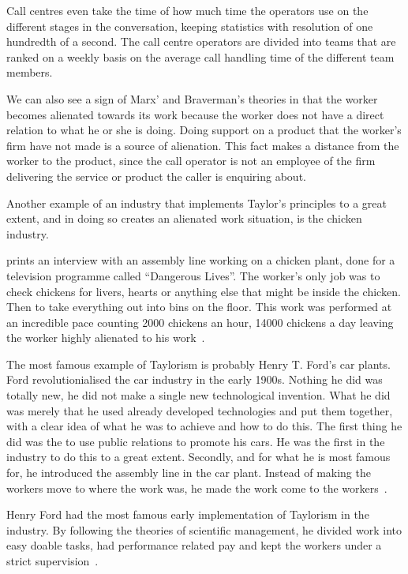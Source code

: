 \documentclass[a4paper,12pt,titlepage]{article}
\begin{document}
  Call centres even take the time of how much time the operators
  use on the different stages in the conversation, keeping statistics
  with resolution of one hundredth of a second.
  The call centre operators are divided into
  teams that are ranked on a weekly basis on the average call
  handling time of the different team members. 
  
  We can also see a sign of Marx' and Braverman's theories in that
  the worker becomes alienated towards its work because the worker does not
  have a direct relation to what he or she is doing. Doing support on a
  product that the worker's firm have not made is a source of alienation.
  This fact makes a distance from the worker to the product, 
  since the call operator is not an employee of the firm delivering
  the service or product the caller is enquiring about.

  Another example of an industry that implements Taylor's principles
  to a great extent, and in doing so creates an alienated work situation,
  is the chicken industry. 

  \cite{mnpb} prints an interview with an assembly line working on
  a chicken plant, done for a television programme called ``Dangerous Lives''.
  The worker's only job was to check chickens for livers, hearts or
  anything else that might be inside the chicken. Then to take everything
  out into bins on the floor. This work was performed at an
  incredible pace counting 2000 chickens an hour, 14000 chickens a day
  leaving the worker highly alienated to his work~\cite[147-148]{mnpb}.
  
  The most famous example of Taylorism is probably Henry T. Ford's
  car plants. Ford revolutionialised the car industry in the early 1900s.
  Nothing he did was totally new, he did not make a single new
  technological invention. What he did was merely that he used already
  developed technologies and put them together, with a clear idea
  of what he was to achieve and how to do this.
  The first thing he did was the to use public relations to promote his
  cars. He was the first in the industry to do this to a great extent.
  Secondly, and for what he is most famous for, he introduced the
  assembly line in the car plant. Instead of making the workers move
  to where the work was, he made the work come to the workers~\cite[18]{be}.

  Henry Ford had the most famous early implementation of Taylorism in
  the industry. By following the theories of scientific management, he
  divided work into easy doable tasks, had performance related pay and
  kept the workers under a strict supervision~\cite[146-148]{mnpb}.
\end{document}
